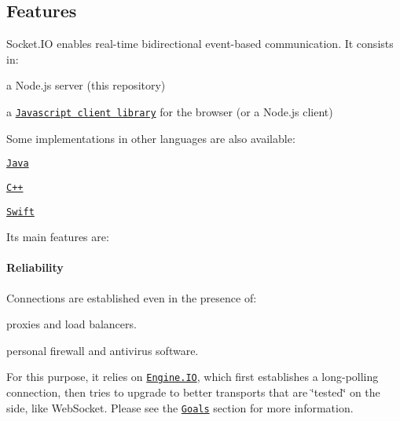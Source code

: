 \href{#backers}{\tt } \href{#sponsors}{\tt } \href{https://travis-ci.org/socketio/socket.io}{\tt } \href{https://david-dm.org/socketio/socket.io}{\tt } \href{https://david-dm.org/socketio/socket.io#info=devDependencies}{\tt } \href{https://www.npmjs.com/package/socket.io}{\tt }  \href{https://slackin-socketio.now.sh}{\tt }

\subsection*{Features}

Socket.\+IO enables real-\/time bidirectional event-\/based communication. It consists in\+:


\begin{DoxyItemize}
\item a Node.\+js server (this repository)
\item a \href{https://github.com/socketio/socket.io-client}{\tt Javascript client library} for the browser (or a Node.\+js client)
\end{DoxyItemize}

Some implementations in other languages are also available\+:


\begin{DoxyItemize}
\item \href{https://github.com/socketio/socket.io-client-java}{\tt Java}
\item \href{https://github.com/socketio/socket.io-client-cpp}{\tt C++}
\item \href{https://github.com/socketio/socket.io-client-swift}{\tt Swift}
\end{DoxyItemize}

Its main features are\+:

\paragraph*{Reliability}

Connections are established even in the presence of\+:
\begin{DoxyItemize}
\item proxies and load balancers.
\item personal firewall and antivirus software.
\end{DoxyItemize}

For this purpose, it relies on \href{https://github.com/socketio/engine.io}{\tt Engine.\+IO}, which first establishes a long-\/polling connection, then tries to upgrade to better transports that are \char`\"{}tested\char`\"{} on the side, like Web\+Socket. Please see the \href{https://github.com/socketio/engine.io#goals}{\tt Goals} section for more information.

